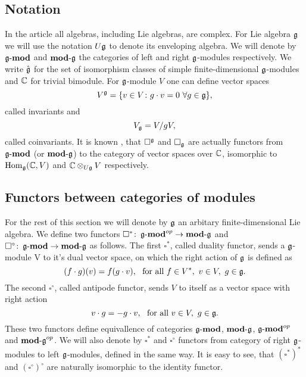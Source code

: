 % 

\subsection{Notation} 
In the article all algebras, including Lie algebras, are complex.  For Lie algebra $\mathfrak{g}$ we will
use the notation $U\mathfrak{g}$ to denote its enveloping algebra. We will denote by $\operatorname{\mathbf{\mathfrak{g}-mod}}$ and
$\operatorname{\mathbf{mod-\mathfrak{g}}}$ the categories of left and right $\mathfrak{g}$-modules respectively.  We write $\hat{\mathfrak{g}}$
for the set of isomorphism classes of simple finite-dimensional $\mathfrak{g}$-modules and $\mathbb{C}$
for trivial bimodule.  For $\mathfrak{g}$-module $V$ one can define vector spaces 
\begin{equation}
    V^{\mathfrak{g}} = \{v\in V\colon g\cdot v = 0 ~ \forall g\in \mathfrak{g} \}, 
\end{equation}
called invariants and
\begin{equation}
    V_{\mathfrak{g}} = V/gV,
\end{equation}
called coinvariants. It is known \cite{weibel}, that $\square^{\mathfrak{g}}$ and $\square_{\mathfrak{g}}$ are actually
functors from $\operatorname{\mathbf{\mathfrak{g}-mod}}$ (or $\operatorname{\mathbf{mod-\mathfrak{g}}}$) to the category of vector spaces over $\mathbb{C}$,
isomorphic to $\operatorname{Hom}_{\mathfrak{g}}(\mathbb{C}, V)$ and $\mathbb{C} \otimes_{U\mathfrak{g}} V$ respectively. 

\subsection{Functors between categories of modules}
For the rest of this section we will denote by $\mathfrak{g}$ an arbitary finite-dimensional Lie algebra.
We define two functors $\square^*\colon \operatorname{\mathbf{\mathfrak{g}-mod}}^{op} \to \operatorname{\mathbf{mod-\mathfrak{g}}}$ and
$\square^\circ\colon \operatorname{\mathbf{\mathfrak{g}-mod}} \to \operatorname{\mathbf{mod-\mathfrak{g}}}$ as follows. The first $\square^*$, called
duality functor, sends a $\mathfrak{g}$-module V to it's dual vector space, on which the right action of
$\mathfrak{g}$ is defined as 
\[
    (f\cdot g) (v) = f(g\cdot v),~\text{ for all } f\in V^*,~v \in V,~g\in\mathfrak{g}.
\]
The second $\square^\circ$, called antipode functor, sends $V$ to itself as a vector space with right
action
\[
    v\cdot g = - g\cdot v,~\text{ for all } v \in V,~g\in\mathfrak{g}.
\]
These two functors define equivallence of categories $\operatorname{\mathbf{\mathfrak{g}-mod}}$, $\operatorname{\mathbf{mod-\mathfrak{g}}}$, $\operatorname{\mathbf{\mathfrak{g}-mod}}^{op}$
and $\operatorname{\mathbf{mod-\mathfrak{g}}}^{op}$. We will also denote by $\square^*$ and $\square^\circ$ functors from
category of right $\mathfrak{g}$-modules to left $\mathfrak{g}$-modules, defined in the same way. It is easy to see,
that $(\square^*)^*$ and $(\square^\circ)^\circ$ are naturally isomorphic to the identity functor.

